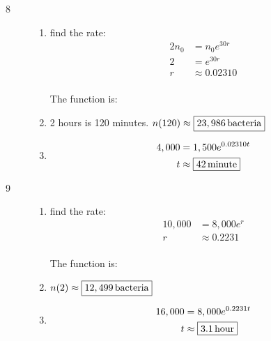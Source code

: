 \documentclass{exam}
\begin{document}
\begin{description}
      \item[8] 
        \begin{enumerate}[a]
          \item find the rate:
            \begin{align*}
              2n_0 & = n_0 e^{30r} \\
              2    & =  e^{30r} \\
              r    & \approx 0.02310 \\
            \end{align*}

            The function is: 

          \item 2 hours is 120 minutes.  $n(120) \approx \boxed{\unit[23,986]{bacteria}}$

          \item 
            \begin{align*}
              4,000 & = 1,500 e^{0.02310 t} \\
              t     & \approx \boxed{\unit[42]{minute}} \\
            \end{align*}

        \end{enumerate}

      \item[9] 
        \begin{enumerate}[a]
          \item find the rate:
            \begin{align*}
              10,000 & = 8,000 e^{r} \\
              r      & \approx 0.2231 \\
            \end{align*}

            The function is: 

          \item $n(2) \approx \boxed{\unit[12,499]{bacteria}}$

          \item 
            \begin{align*}
              16,000 & = 8,000 e^{0.2231 t} \\
              t      & \approx \boxed{\unit[3.1]{hour}} \\
            \end{align*}

        \end{enumerate}


\end{description}
\end{document}
